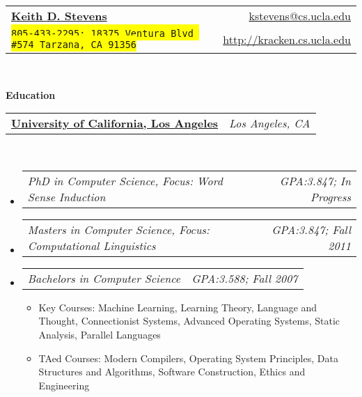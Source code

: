 \documentclass[letterpaper,11pt]{article}
\makeatletter
\newcommand{\resitem}[1]{\item #1 \vspace{-2pt}}
\newcommand{\resheading}[1]{{\large \colorbox{mygrey}{\begin{minipage}{\textwidth}{\textbf{#1 \vphantom{p\^{E}}}}\end{minipage}}}}
\newcommand{\multiHeading}[2]{
\begin{tabular*}{6.5in}{l@{\extracolsep{\fill}}r}
  \textbf{#1} & \textit{#2} \\
\end{tabular*}\vspace{-6pt}}
\newcommand{\multiPart}[2]{
\begin{tabular*}{6.5in}{l@{\extracolsep{\fill}}r}
  \textit{#1} & \textit{#2} \\
\end{tabular*}\vspace{-6pt}}
\makeatother
\begin{document}
\newcommand{\mywebheader}{
\begin{tabular*}{7in}{l@{\extracolsep{\fill}}r}
	\textbf{\href{http://kracken.cs.ucla.edu/}{\LARGE Keith D. Stevens}} & \href{mailto:kstevens@cs.ucla.edu}{kstevens@cs.ucla.edu}\\
	{\footnotesize \texttt{\colorbox{yellow}{805-433-2295; 18375 Ventura Blvd \#574 Tarzana, CA 91356}}} & \href{http://kracken.cs.ucla.edu}{http://kracken.cs.ucla.edu} \\
	\end{tabular*}
\\
\vspace{0.1in}}

\mywebheader

\resheading{Education}
  \multiHeading{\href{http://www.ucla.edu}{University of California, Los Angeles}}
               {Los Angeles, CA}  \\
  \begin{itemize}
    \item \multiPart{PhD in Computer Science, Focus: Word Sense Induction}{GPA:3.847; In Progress}
    \item \multiPart{Masters in Computer Science, Focus: Computational
    Linguistics}{GPA:3.847; Fall 2011}
    \item \multiPart{Bachelors in Computer Science}{GPA:3.588; Fall 2007}
    { \footnotesize
    \begin{itemize}
      \resitem{Key Courses: Machine Learning, Learning Theory, Language and
      Thought, Connectionist Systems, Advanced Operating Systems, Static
      Analysis, Parallel Languages}
      \resitem{TAed Courses: Modern Compilers, Operating System Principles, Data
      Structures and Algorithms, Software Construction, Ethics and Engineering}
    \end{itemize}
    }
  \end{itemize} %
\end{document}

